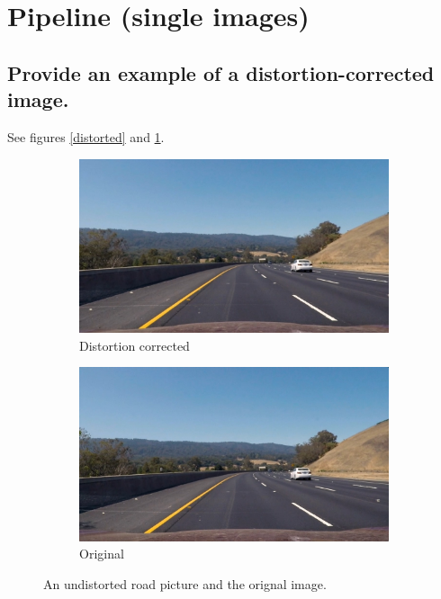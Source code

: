 \documentclass[12pt,a4paper]{article}
\begin{document}
\section{Pipeline (single images)}


\subsection{Provide an example of a distortion-corrected image.}

See figures \ref{distorted} and \ref{distorted_road}.

\begin{figure}
    \centering
    \begin{subfigure}[b]{0.45\textwidth}
        \includegraphics[width=\textwidth]{../output_images/undist-test3.jpg}
        \caption{Distortion corrected}
    \end{subfigure}
    \begin{subfigure}[b]{0.45\textwidth}
        \includegraphics[width=\textwidth]{../output_images/original-test3.jpg}
        \caption{Original}
    \end{subfigure}
    \caption{An undistorted road picture and the orignal image.}
    \label{distorted_road}
\end{figure}
\end{document}
